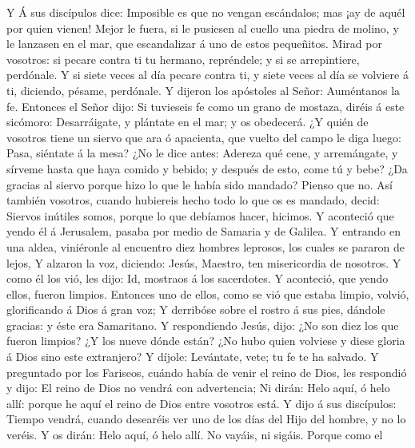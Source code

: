  Y Á sus discípulos dice: Imposible es que no vengan
escándalos; mas ¡ay de aquél por quien vienen!  Mejor le
fuera, si le pusiesen al cuello una piedra de molino, y le lanzasen en
el mar, que escandalizar á uno de estos pequeñitos.  Mirad
por vosotros: si pecare contra ti tu hermano, repréndele; y si se
arrepintiere, perdónale.  Y si siete veces al día pecare
contra ti, y siete veces al día se volviere á ti, diciendo, pésame,
perdónale.  Y dijeron los apóstoles al Señor: Auméntanos
la fe.  Entonces el Señor dijo: Si tuvieseis fe como un
grano de mostaza, diréis á este sicómoro: Desarráigate, y plántate en el
mar; y os obedecerá.  ¿Y quién de vosotros tiene un siervo
que ara ó apacienta, que vuelto del campo le diga luego: Pasa, siéntate
á la mesa?  ¿No le dice antes: Adereza qué cene, y
arremángate, y sírveme hasta que haya comido y bebido; y después de
esto, come tú y bebe?  ¿Da gracias al siervo porque hizo
lo que le había sido mandado? Pienso que no.  Así también
vosotros, cuando hubiereis hecho todo lo que os es mandado, decid:
Siervos inútiles somos, porque lo que debíamos hacer, hicimos.
 Y aconteció que yendo él á Jerusalem, pasaba por medio
de Samaria y de Galilea.  Y entrando en una aldea,
viniéronle al encuentro diez hombres leprosos, los cuales se pararon de
lejos,  Y alzaron la voz, diciendo: Jesús, Maestro, ten
misericordia de nosotros.  Y como él los vió, les dijo:
Id, mostraos á los sacerdotes. Y aconteció, que yendo ellos, fueron
limpios.  Entonces uno de ellos, como se vió que estaba
limpio, volvió, glorificando á Dios á gran voz;  Y
derribóse sobre el rostro á sus pies, dándole gracias: y éste era
Samaritano.  Y respondiendo Jesús, dijo: ¿No son diez los
que fueron limpios? ¿Y los nueve dónde están?  ¿No hubo
quien volviese y diese gloria á Dios sino este extranjero?
 Y díjole: Levántate, vete; tu fe te ha salvado.
 Y preguntado por los Fariseos, cuándo había de venir el
reino de Dios, les respondió y dijo: El reino de Dios no vendrá con
advertencia;  Ni dirán: Helo aquí, ó helo allí: porque he
aquí el reino de Dios entre vosotros está.  Y dijo á sus
discípulos: Tiempo vendrá, cuando desearéis ver uno de los días del Hijo
del hombre, y no lo veréis.  Y os dirán: Helo aquí, ó
helo allí. No vayáis, ni sigáis.  Porque como el
